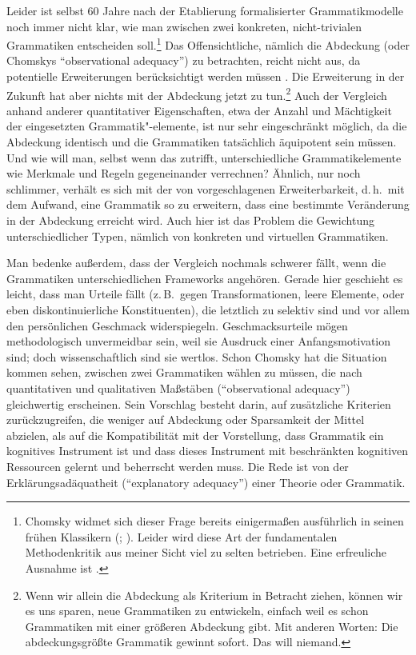 Leider ist selbst 60 Jahre nach der Etablierung formalisierter Grammatikmodelle noch immer nicht klar, wie man zwischen zwei konkreten, nicht-trivialen Grammatiken entscheiden soll.\footnote{Chomsky widmet sich dieser Frage bereits einigermaßen ausführlich in seinen frühen Klassikern (\citealt[Chapter~2]{Chomsky:64}; \citealt[Chapter~1]{Chomsky:65}). Leider wird diese Art der fundamentalen Methodenkritik aus meiner Sicht viel zu selten betrieben. Eine erfreuliche Ausnahme ist \cite[Kapitel~20]{Mueller:07}.} Das Offensichtliche, nämlich die Abdeckung (oder Chomskys "`observational adequacy"') zu betrachten, reicht nicht aus, da potentielle Erweiterungen berücksichtigt werden müssen \citep[Kapitel~20]{Mueller:07}. Die Erweiterung in der Zukunft hat aber nichts mit der Abdeckung jetzt zu tun.\footnote{Wenn wir allein die Abdeckung als Kriterium in Betracht ziehen, können wir es uns sparen, neue Grammatiken zu entwickeln, einfach weil es schon Grammatiken mit einer größeren Abdeckung gibt. Mit anderen Worten: Die abdeckungsgrößte Grammatik gewinnt sofort. Das will niemand.} Auch der Vergleich anhand anderer quantitativer Eigenschaften, etwa der Anzahl und Mächtigkeit der eingesetzten Grammatik"-elemente, ist nur sehr eingeschränkt möglich, da die Abdeckung identisch und die Grammatiken tatsächlich äquipotent sein müssen. Und wie will man, selbst wenn das zutrifft, unterschiedliche Grammatikelemente wie Merkmale und Regeln gegeneinander verrechnen? Ähnlich, nur noch schlimmer, verhält es sich mit der von \cite[403]{Mueller:07} vorgeschlagenen Erweiterbarkeit, d.\,h.\ mit dem Aufwand, eine Grammatik so zu erweitern, dass eine bestimmte Veränderung in der Abdeckung erreicht wird. Auch hier ist das Problem die Gewichtung unterschiedlicher Typen, nämlich von konkreten und virtuellen Grammatiken.

Man bedenke außerdem, dass der Vergleich nochmals schwerer fällt, wenn die Grammatiken unterschiedlichen Frameworks angehören. Gerade hier geschieht es leicht, dass man Urteile fällt (z.\,B.\ gegen Transformationen, leere Elemente, oder eben diskontinuierliche Konstituenten), die letztlich zu selektiv sind und vor allem den persönlichen Geschmack widerspiegeln. Geschmacksurteile mögen methodologisch unvermeidbar sein, weil sie Ausdruck einer Anfangsmotivation sind; doch wissenschaftlich sind sie wertlos. Schon Chomsky hat die Situation kommen sehen, zwischen zwei Grammatiken wählen zu müssen, die nach quantitativen und qualitativen Maßstäben ("`observational adequacy"') gleichwertig erscheinen. Sein Vorschlag besteht darin, auf zusätzliche Kriterien zurückzugreifen, die weniger auf Abdeckung oder Sparsamkeit der Mittel abzielen, als auf die Kompatibilität mit der Vorstellung, dass Grammatik ein kognitives Instrument ist und dass dieses Instrument mit beschränkten kognitiven Ressourcen gelernt und beherrscht werden muss. Die Rede ist von der Erklärungsadäquatheit ("`explanatory adequacy"') einer Theorie oder Grammatik. 

